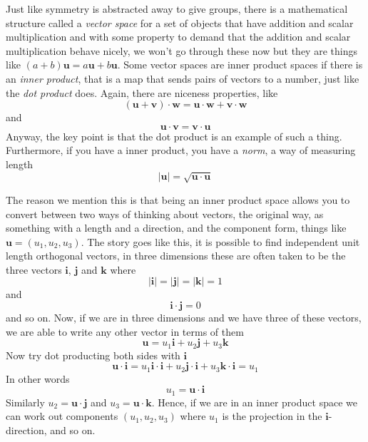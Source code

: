 \documentclass[12pt]{article}
\begin{document}
Just like symmetry is abstracted away to give groups, there is a
mathematical structure called a \textsl{vector space} for a set of
objects that have addition and scalar multiplication and with some
property to demand that the addition and scalar multiplication behave
nicely, we won't go through these now but they are things like
$(a+b)\mathbf{u}=a\mathbf{u}+b\mathbf{u}$. Some vector spaces are
inner product spaces if there is an \textsl{inner product}, that is a
map that sends pairs of vectors to a number, just like the \textsl{dot
  product} does. Again, there are niceness properties, like 
\begin{equation}
(\mathbf{u}+\mathbf{v})\cdot\mathbf{w}=\mathbf{u}\cdot\mathbf{w}+\mathbf{v}\cdot\mathbf{w}
\end{equation}
and
\begin{equation}
\mathbf{u}\cdot\mathbf{v}=\mathbf{v}\cdot\mathbf{u}
\end{equation}
Anyway, the key point is that the dot product is an example of such a
thing. Furthermore, if you have a inner product, you have a
\textsl{norm}, a way of measuring length
\begin{equation}
|\mathbf{u}|=\sqrt{\mathbf{u}\cdot\mathbf{u}}
\end{equation}

The reason we mention this is that being an inner product space allows
you to convert between two ways of thinking about vectors, the
original way, as something with a length and a direction, and the
component form, things like $\mathbf{u}=(u_1,u_2,u_3)$. The story goes
like this, it is possible to find independent unit length orthogonal
vectors, in three dimensions these are often taken to be the three
vectors $\mathbf{i}$, $\mathbf{j}$ and $\mathbf{k}$ where 
\begin{equation}
|\mathbf{i}|=|\mathbf{j}|=|\mathbf{k}|=1
\end{equation}
and
\begin{equation}
\mathbf{i}\cdot\mathbf{j}=0
\end{equation}
and so on. Now, if we are in three dimensions and we have three of
these vectors, we are able to write any other vector in terms of them
\begin{equation}
\mathbf{u}=u_1\mathbf{i}+u_2\mathbf{j}+u_3\mathbf{k}
\end{equation}
Now try dot producting both sides with $\mathbf{i}$
\begin{equation}
\mathbf{u}\cdot\mathbf{i}=u_1\mathbf{i}\cdot\mathbf{i}+u_2\mathbf{j}\cdot\mathbf{i}+u_3\mathbf{k}\cdot\mathbf{i}=u_1
\end{equation}
In other words
\begin{equation}
u_1=\mathbf{u}\cdot\mathbf{i}
\end{equation}
Similarly $u_2=\mathbf{u}\cdot\mathbf{j}$ and
$u_3=\mathbf{u}\cdot\mathbf{k}$. Hence, if we are in an inner product
space we can work out components $(u_1,u_2,u_3)$ where $u_1$ is the
projection in the $\mathbf{i}$-direction, and so on. 
\end{document}

